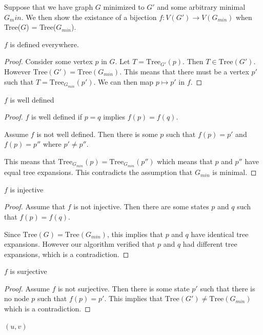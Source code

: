 \documentclass{svproc}
\begin{document}
Suppose that we have graph $G$ minimized to $G'$ and some arbitrary minimal $G_min$. We then show the existance of a bijection $f : V(G') \rightarrow V(G_{min})$ when Tree($G$) = Tree($G_{min}$).

\begin{lemma}
  $f$ is defined everywhere.
\end{lemma}
\begin{proof}
  Consider some vertex $p$ in $G$. Let $T=\text{Tree}_{G'}(p)$. Then $T \in \text{Tree}(G')$. However $\text{Tree}(G')=\text{Tree}(G_{min})$. This means that there must be a vertex $p'$ such that $T=\text{Tree}_{G_{min}}(p')$. We can then map $p \mapsto p'$ in $f$.
\end{proof}

\begin{lemma}
  $f$ is well defined
\end{lemma}
\begin{proof}
  $f$ is well defined if $p=q$ implies $f(p)=f(q)$.

  Assume $f$ is not well defined. Then there is some $p$ such that $f(p)=p'$ and $f(p)=p''$ where $p' \neq p''$.

  This means that $\text{Tree}_{G_{min}}(p)=\text{Tree}_{G_{min}}(p'')$ which means that $p$ and $p''$ have equal tree expansions. This contradicts the assumption that $G_{min}$ is minimal.
\end{proof}

\begin{lemma}
  $f$ is injective
\end{lemma}
\begin{proof}
  Assume that $f$ is not injective. Then there are some states $p$ and $q$ such that $f(p)=f(q)$.

  Since $\text{Tree}(G)=\text{Tree}(G_{min})$, this implies that $p$ and $q$ have identical tree expansions. However our algorithm verified that $p$ and $q$ had different tree expansions, which is a contradiction.
\end{proof}

\begin{lemma}
  $f$ is surjective
\end{lemma}
\begin{proof}
  Assume $f$ is not surjective. Then there is some state $p'$ such that there is no node $p$ such that $f(p)=p'$. This implies that $\text{Tree}(G') \neq \text{Tree}(G_{min})$ which is a contradiction.
\end{proof}

\begin{lemma}
  $(u, v)$
\end{lemma}
\end{document}
